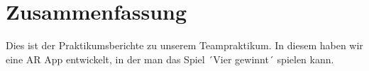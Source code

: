 \section{Zusammenfassung}
Dies ist der Praktikumsberichte zu unserem Teampraktikum. In diesem haben wir
eine AR App entwickelt, in der man das Spiel ´Vier gewinnt´ spielen kann. 
